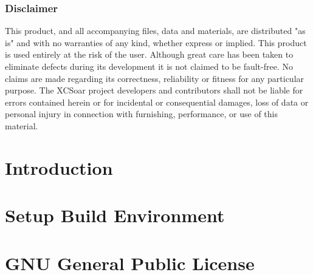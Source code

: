 \documentclass[german,a4paper,11pt]{refrep}
\begin{document}
\subsection*{Disclaimer}
This product, and all accompanying files, data and materials, are
distributed "as is" and with no warranties of any kind, whether
express or implied.  This product is used entirely at the risk of the
user.  Although great care has been taken to eliminate defects during
its development it is not claimed to be fault-free. No claims are made
regarding its correctness, reliability or fitness for any particular
purpose.  The XCSoar project developers and contributors shall not be
liable for errors contained herein or for incidental or consequential
damages, loss of data or personal injury in connection with
furnishing, performance, or use of this material.


\chapter{Introduction}\label{cha:intrudoction}
%

\chapter{Setup Build Environment}


%

%

\pagestyle{empty}\hypersetup{linkcolor=orange}
\printindex

\appendix

\chapter{GNU General Public License}\label{cha:gnu-general-public}


\end{document}
